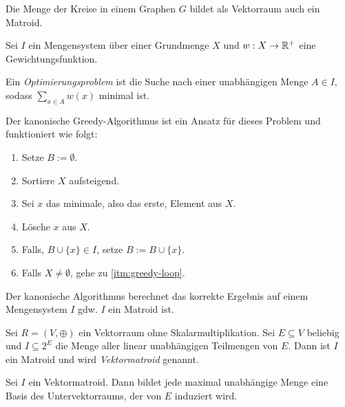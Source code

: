 \begin{remark}
    Die Menge der Kreise in einem Graphen $ G $ bildet als Vektorraum auch ein Matroid.
\end{remark}

\begin{definition}
    Sei $ I $ ein Mengensystem über einer Grundmenge $ X $ und $ w : X \rightarrow \mathbb{R}^+ $ eine Gewichtungsfunktion.

    Ein \textit{Optimierungsproblem} ist die Suche nach einer unabhängigen Menge $ A \in I $, sodass $ \sum_{x \in A} w(x) $ minimal ist.

    Der kanonische Greedy-Algorithmus ist ein Ansatz für dieses Problem und funktioniert wie folgt:
    \begin{enumerate}
        \item Setze $ B := \emptyset $.
        \item Sortiere $ X $ aufsteigend.
        \item \label{itm:greedy-loop} Sei $ x $ das minimale, also das erste, Element aus $ X $.
        \item Lösche $ x $ aus $ X $.
        \item Falls, $ B \cup \{ x \} \in I $, setze $ B := B \cup \{ x \} $.
        \item Falls $ X \ne \emptyset $, gehe zu \ref{itm:greedy-loop}.
    \end{enumerate}
\end{definition}

\begin{proposition}
    Der kanonische Algorithmus berechnet das korrekte Ergebnis auf einem Mengensystem $ I $ gdw. $ I $ ein Matroid ist.
\end{proposition}

\begin{definition}
    Sei $ R = (V, \oplus) $ ein Vektorraum ohne Skalarmultiplikation.
    Sei $ E \subseteq V $ beliebig und $ I \subseteq 2^E $ die Menge aller linear unabhängigen Teilmengen von $ E $.
    Dann ist $ I $ ein Matroid und wird \textit{Vektormatroid} genannt.
\end{definition}

\begin{proposition}
    Sei $ I $ ein Vektormatroid.
    Dann bildet jede maximal unabhängige Menge eine Basis des Untervektorraums, der von $ E $ induziert wird.
\end{proposition}

